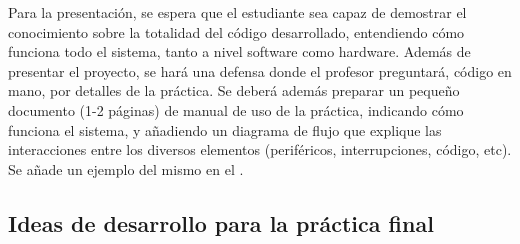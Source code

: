 \documentclass[../main.tex]{subfiles}
\begin{document}
        Para la presentación, se espera que el estudiante sea capaz de demostrar el conocimiento sobre la totalidad del código desarrollado, entendiendo cómo funciona todo el sistema, tanto a nivel software como hardware. Además de presentar el proyecto, se hará una defensa donde el profesor preguntará, código en mano, por detalles de la práctica. Se deberá además preparar un pequeño documento (1-2 páginas) de manual de uso de la práctica, indicando cómo funciona el sistema, y añadiendo un diagrama de flujo que explique las interacciones entre los diversos elementos (periféricos, interrupciones, código, etc). Se añade un ejemplo del mismo en el .

    \subsection{Ideas de desarrollo para la práctica final}
\end{document}
